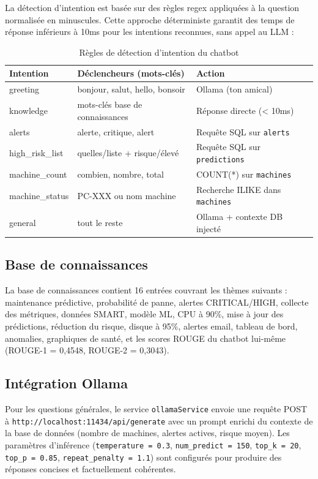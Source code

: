 La détection d'intention est basée sur des règles regex appliquées à la question
normalisée en minuscules. Cette approche déterministe garantit des temps de réponse
inférieurs à 10ms pour les intentions reconnues, sans appel au LLM :

\begin{table}[H]
\centering
\caption{Règles de détection d'intention du chatbot}
\begin{tabularx}{\textwidth}{|l|X|l|}
\hline
\rowcolor{lightblue}
\textbf{Intention} & \textbf{Déclencheurs (mots-clés)} & \textbf{Action} \\
\hline
greeting & bonjour, salut, hello, bonsoir & Ollama (ton amical) \\
\hline
knowledge & mots-clés base de connaissances & Réponse directe (< 10ms) \\
\hline
alerts & alerte, critique, alert & Requête SQL sur \texttt{alerts} \\
\hline
high\_risk\_list & quelles/liste + risque/élevé & Requête SQL sur \texttt{predictions} \\
\hline
machine\_count & combien, nombre, total & COUNT(*) sur \texttt{machines} \\
\hline
machine\_status & PC-XXX ou nom machine & Recherche ILIKE dans \texttt{machines} \\
\hline
general & tout le reste & Ollama + contexte DB injecté \\
\hline
\end{tabularx}
\end{table}

\subsection{Base de connaissances}

La base de connaissances contient 16 entrées couvrant les thèmes suivants :
maintenance prédictive, probabilité de panne, alertes CRITICAL/HIGH, collecte des
métriques, données SMART, modèle ML, CPU à 90\%, mise à jour des prédictions,
réduction du risque, disque à 95\%, alertes email, tableau de bord, anomalies,
graphiques de santé, et les scores ROUGE du chatbot lui-même
(ROUGE-1 = 0,4548, ROUGE-2 = 0,3043).

\subsection{Intégration Ollama}

Pour les questions générales, le service \texttt{ollamaService} envoie une requête
POST à \texttt{http://localhost:11434/api/generate} avec un prompt enrichi du contexte
de la base de données (nombre de machines, alertes actives, risque moyen). Les
paramètres d'inférence (\texttt{temperature = 0.3}, \texttt{num\_predict = 150},
\texttt{top\_k = 20}, \texttt{top\_p = 0.85}, \texttt{repeat\_penalty = 1.1})
sont configurés pour produire des réponses concises et factuellement cohérentes.

